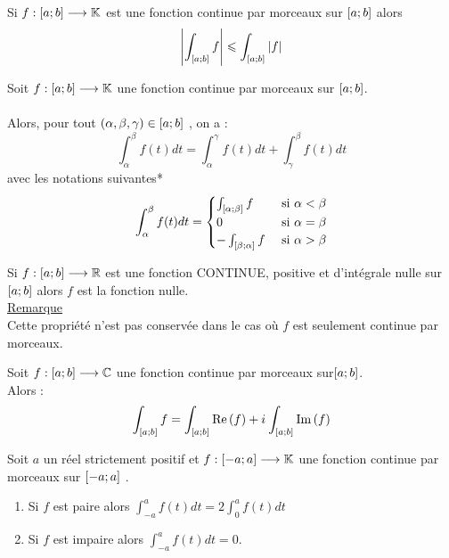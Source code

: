 \begin{defprop}
    Si \(f : \left[a;b\right] \longrightarrow \mathbb{K}\) est une fonction continue par morceaux sur \(\left[a;b\right]\) alors
    \[\left\lvert\int_{\left[a;b\right]} f\right\rvert \leqslant \int_{\left[a;b\right]} \left\lvert f \right\rvert\]
\end{defprop}
\begin{defprop}
    Soit \(f : \left[a;b\right] \longrightarrow \mathbb{K}\) une fonction continue par morceaux sur \(\left[a;b\right]\).\\~\\
    Alors, pour tout \((\alpha, \beta, \gamma) \in  \left[a;b\right]\) , on a :
    \[\int^{\beta}_{\alpha} f (t) dt = \int^{\gamma}_{\alpha} f (t) dt + \int^{\beta}_{\gamma} f (t) dt\]
    avec les notations suivantes*
    \[\int^{\beta}_{\alpha} f (t) dt = \begin{cases}
        \int_{\left[\alpha;\beta\right]} f &\text{ si } \alpha < \beta \\
        0 & \text{ si } \alpha = \beta \\
        - \int_{\left[\beta;\alpha\right]} f &\text{ si } \alpha > \beta
    \end{cases}\]
\end{defprop}
\begin{defprop}
    Si \(f : \left[a;b\right] \longrightarrow \mathbb{R}\) est une fonction CONTINUE, positive et d’intégrale nulle sur \(\left[a;b\right]\) alors \(f\) est la fonction nulle. \\
    \underline{Remarque} \\
    Cette propriété n’est pas conservée dans le cas où \(f\) est seulement continue par morceaux.
\end{defprop}
\begin{defprop}
    Soit \(f : \left[a;b\right] \longrightarrow \mathbb{C}\) une fonction continue par morceaux sur\( \left[a;b\right]\). \\
    Alors : 
    \[\int_{\left[a;b\right]} f = \int_{\left[a;b\right]} \operatorname{Re}\left(f\right) + i\mkern1mu \int_{\left[a;b\right]} \operatorname{Im}\left(f \right)\]
\end{defprop}

\begin{defprop}
    Soit \(a\) un réel strictement positif et \(f : \left[-a;a\right] \longrightarrow \mathbb{K}\) une fonction continue par morceaux sur \(\left[-a;a\right]\) .
    \begin{enumerate}
        \item Si \(f\) est paire alors \(\int^a_{- a} f (t) dt = 2 \int^a_0 f (t) dt\)
        \item Si \(f\) est impaire alors \(\int^a_{- a} f (t) dt = 0\).
    \end{enumerate}
\end{defprop}

